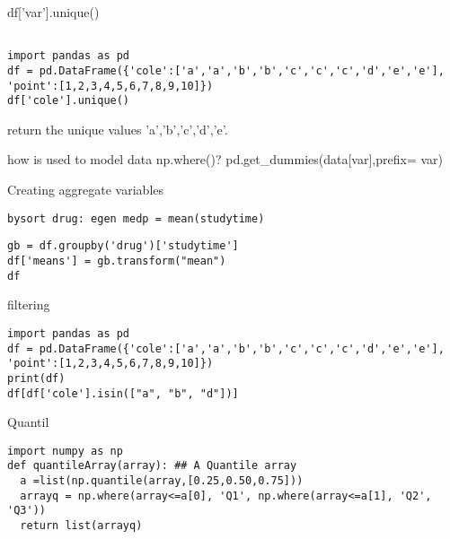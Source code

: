 \documentclass{beamer}
\begin{document}
\begin{frame}[fragile]{df['var'].unique()}

\begin{lstlisting}

import pandas as pd
df = pd.DataFrame({'cole':['a','a','b','b','c','c','c','d','e','e'], 'point':[1,2,3,4,5,6,7,8,9,10]})
df['cole'].unique()

\end{lstlisting}

return the unique values 'a','b','c','d','e'.

how is used to model data np.where()?
pd.get_dummies(data[var],prefix= var)
\end{frame}



\begin{frame}[fragile]{Creating aggregate variables}
\begin{verbatim}
bysort drug: egen medp = mean(studytime)
\end{verbatim}


\begin{lstlisting}
gb = df.groupby('drug')['studytime']
df['means'] = gb.transform("mean")
df
\end{lstlisting}
\end{frame}









\begin{frame}[fragile]{filtering}
\begin{lstlisting}
import pandas as pd
df = pd.DataFrame({'cole':['a','a','b','b','c','c','c','d','e','e'], 'point':[1,2,3,4,5,6,7,8,9,10]})
print(df)
df[df['cole'].isin(["a", "b", "d"])]
\end{lstlisting}
\end{frame}



\begin{frame}[fragile]{Quantil}
\begin{lstlisting}
import numpy as np
def quantileArray(array): ## A Quantile array
  a =list(np.quantile(array,[0.25,0.50,0.75]))
  arrayq = np.where(array<=a[0], 'Q1', np.where(array<=a[1], 'Q2', 'Q3'))
  return list(arrayq)
\end{lstlisting}
\end{frame}
\end{document}
